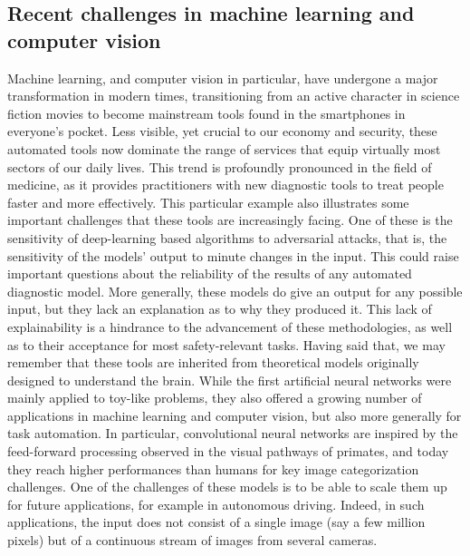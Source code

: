 \documentclass[default]{sn-jnl}%
\theoremstyle{thmstyleone}%
\theoremstyle{thmstyletwo}%
\theoremstyle{thmstylethree}%
\begin{document}
\subsection{Recent challenges in machine learning and computer vision}
Machine learning, and computer vision in particular, have undergone a major transformation in modern times, transitioning from an active character in science fiction movies to become mainstream tools found in the smartphones in everyone's pocket. Less visible, yet crucial to our economy and security, these automated tools now dominate the range of services that equip virtually most sectors of our daily lives. This trend is profoundly pronounced in the field of medicine, as it provides practitioners with new diagnostic tools to treat people faster and more effectively. This particular example also illustrates some important challenges that these tools are increasingly facing. One of these is the sensitivity of deep-learning based algorithms to adversarial attacks, that is, the sensitivity of the models' output to minute changes in the input. This could raise important questions about the reliability of the results of any automated diagnostic model. More generally, these models do give an output for any possible input, but they lack an explanation as to why they produced it. This lack of explainability is a hindrance to the advancement of these methodologies, as well as to their acceptance for most safety-relevant tasks. Having said that, we may remember that these tools are inherited from theoretical models originally designed to understand the brain. While the first artificial neural networks were mainly applied to toy-like problems, they also offered a growing number of applications in machine learning and computer vision, but also more generally for task automation. In particular, convolutional neural networks are inspired by the feed-forward processing observed in the visual pathways of primates, and today they reach higher performances than humans for key image categorization challenges. One of the challenges of these models is to be able to scale them up for future applications, for example in autonomous driving. Indeed, in such applications, the input does not consist of a single image (say a few million pixels) but of a continuous stream of images from several cameras.
\end{document}
